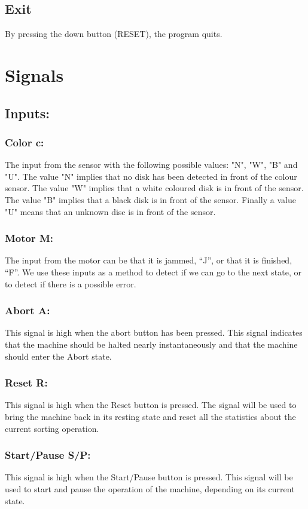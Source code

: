 \documentclass[a4paper,oneside,11pt]{article}
\begin{document}
\subsection{Exit}
By pressing the down button (RESET), the program quits.

\section{Signals}
\subsection{Inputs:}
\subsubsection{Color c:} The input from the sensor with the following possible values: "N", "W", "B" and "U". The value "N" implies that no disk has been detected in front of the colour sensor. The value "W" implies that a white coloured disk is in front of the sensor. The value "B" implies that a black disk is in front of the sensor. Finally a value "U" means that an unknown disc is in front of the sensor.
\subsubsection{Motor M:} The input from the motor can be that it is jammed, “J”, or that it is finished, “F”. We use these inputs as a method to detect if we can go to the next state, or to detect if there is a possible error.
\subsubsection{Abort A:} This signal is high when the abort button has been pressed. This signal indicates that the machine should be halted nearly instantaneously and that the machine should enter the Abort state.
\subsubsection{Reset R:} This signal is high when the Reset button is pressed. The signal will be used to bring the machine back in its resting state and reset all the statistics about the current sorting operation.
\subsubsection{Start/Pause S/P:} This signal is high when the Start/Pause button is pressed. This signal will be used to start and pause the operation of the machine, depending on its current state.
\end{document}
